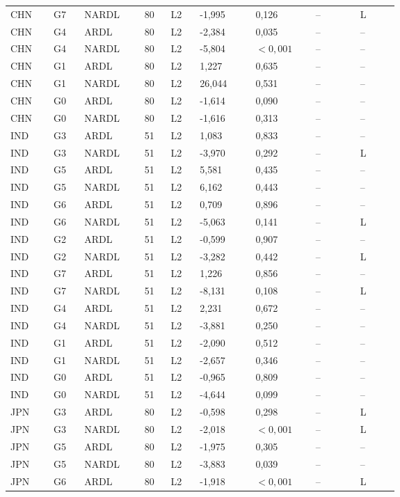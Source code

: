 {\begin{longtable}{p{0.075\linewidth}p{0.05\linewidth}p{0.09\linewidth}p{0.04\linewidth}p{0.05\linewidth}p{0.1\linewidth}p{0.085\linewidth}p{0.085\linewidth}p{0.075\linewidth}}
CHN & G7 & NARDL & 80 & L2 & -1,995 & 0,126 & -- & L\\
CHN & G4 & ARDL & 80 & L2 & -2,384 & 0,035 & -- & --\\
CHN & G4 & NARDL & 80 & L2 & -5,804 & \(<0{,}001\) & -- & --\\
CHN & G1 & ARDL & 80 & L2 & 1,227 & 0,635 & -- & --\\
CHN & G1 & NARDL & 80 & L2 & 26,044 & 0,531 & -- & --\\
CHN & G0 & ARDL & 80 & L2 & -1,614 & 0,090 & -- & --\\
CHN & G0 & NARDL & 80 & L2 & -1,616 & 0,313 & -- & --\\
IND & G3 & ARDL & 51 & L2 & 1,083 & 0,833 & -- & --\\
IND & G3 & NARDL & 51 & L2 & -3,970 & 0,292 & -- & L\\
IND & G5 & ARDL & 51 & L2 & 5,581 & 0,435 & -- & --\\
IND & G5 & NARDL & 51 & L2 & 6,162 & 0,443 & -- & --\\
IND & G6 & ARDL & 51 & L2 & 0,709 & 0,896 & -- & --\\
IND & G6 & NARDL & 51 & L2 & -5,063 & 0,141 & -- & L\\
IND & G2 & ARDL & 51 & L2 & -0,599 & 0,907 & -- & --\\
IND & G2 & NARDL & 51 & L2 & -3,282 & 0,442 & -- & L\\
IND & G7 & ARDL & 51 & L2 & 1,226 & 0,856 & -- & --\\
IND & G7 & NARDL & 51 & L2 & -8,131 & 0,108 & -- & L\\
IND & G4 & ARDL & 51 & L2 & 2,231 & 0,672 & -- & --\\
IND & G4 & NARDL & 51 & L2 & -3,881 & 0,250 & -- & --\\
IND & G1 & ARDL & 51 & L2 & -2,090 & 0,512 & -- & --\\
IND & G1 & NARDL & 51 & L2 & -2,657 & 0,346 & -- & --\\
IND & G0 & ARDL & 51 & L2 & -0,965 & 0,809 & -- & --\\
IND & G0 & NARDL & 51 & L2 & -4,644 & 0,099 & -- & --\\
JPN & G3 & ARDL & 80 & L2 & -0,598 & 0,298 & -- & L\\
JPN & G3 & NARDL & 80 & L2 & -2,018 & \(<0{,}001\) & -- & L\\
JPN & G5 & ARDL & 80 & L2 & -1,975 & 0,305 & -- & --\\
JPN & G5 & NARDL & 80 & L2 & -3,883 & 0,039 & -- & --\\
JPN & G6 & ARDL & 80 & L2 & -1,918 & \(<0{,}001\) & -- & L\\

\end{longtable}}
